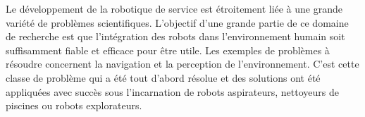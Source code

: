 %

Le développement de la robotique de service est étroitement liée
à une grande variété de problèmes scientifiques. L'objectif d'une grande partie de ce domaine
de recherche est que l'intégration des robots dans l'environnement 
humain soit suffisamment fiable et efficace pour être utile.
Les exemples de problèmes à 
résoudre concernent la navigation et la perception de l'environnement.
C'est cette classe de problème qui a été tout d'abord résolue et des solutions ont été appliquées avec succès 
sous l'incarnation de robots aspirateurs, nettoyeurs de piscines ou 
robots explorateurs.

